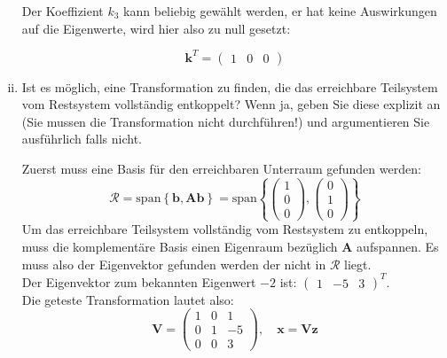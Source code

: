 \documentclass[crop=false]{standalone}
\begin{document}
\begin{task}
\begin{enumerate}[i.]
\begin{solution}
     Der Koeffizient $k_3$ kann beliebig gewählt werden, er hat keine Auswirkungen auf die Eigenwerte, wird hier also zu null gesetzt:
     
     \[\mathbf{k}^T = \begin{pmatrix}1 & 0 & 0\end{pmatrix}\]
     \end{solution}
     \item Ist es möglich, eine Transformation zu finden, die das erreichbare Teilsystem vom Restsystem vollständig entkoppelt? Wenn ja, geben Sie diese explizit an (Sie mussen die Transformation nicht durchführen!) und argumentieren Sie ausführlich falls nicht.
     \begin{solution}
     Zuerst muss eine Basis für den erreichbaren Unterraum gefunden werden:
     \[\mathcal{R} = \text{span}\left\{ \mathbf{b}, \mathbf{Ab}\right\} = \text{span}\left\{ \begin{pmatrix}1\\0\\0\end{pmatrix},\begin{pmatrix}0\\1\\0\end{pmatrix}
     \right\} \]
     Um das erreichbare Teilsystem vollständig vom Restsystem zu entkoppeln, muss die komplementäre Basis einen Eigenraum bezüglich $\mathbf{A}$ aufspannen. Es muss also der Eigenvektor gefunden werden der nicht in $\mathcal{R}$ liegt. \\
     
     Der Eigenvektor zum bekannten Eigenwert $-2$ ist: $\begin{pmatrix}1 & -5 & 3\end{pmatrix}^T$.\\
     Die geteste Transformation lautet also:
     \[ \mathbf{V} = \begin{pmatrix}1 & 0 & 1 \\ 0 & 1 & -5 \\ 0 & 0 & 3\end{pmatrix}, \quad \mathbf{x} = \mathbf{Vz} \]
     \end{solution}
 \end{enumerate}
\end{task}
\end{document}
